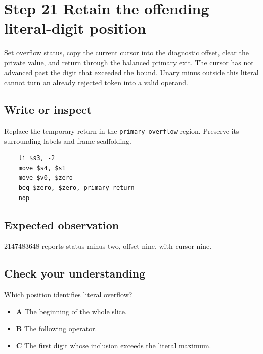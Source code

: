 \section{Step 21 Retain the offending literal-digit position}\label{expression-s21}

Set overflow status, copy the current cursor into the diagnostic offset, clear the private value, and return through the balanced primary exit. The cursor has not advanced past the digit that exceeded the bound. Unary minus outside this literal cannot turn an already rejected token into a valid operand.

\subsection{Write or inspect}
Replace the temporary return in the \texttt{primary\_overflow} region. Preserve its surrounding labels and frame scaffolding.

\begin{verbatim}
    li $s3, -2
    move $s4, $s1
    move $v0, $zero
    beq $zero, $zero, primary_return
    nop
\end{verbatim}
\subsection{Expected observation}
2147483648 reports status minus two, offset nine, with cursor nine.

\subsection{Check your understanding}
Which position identifies literal overflow?

\begin{itemize}
  \item \textbf{A} The beginning of the whole slice.
  \item \textbf{B} The following operator.
  \item \textbf{C} The first digit whose inclusion exceeds the literal maximum.
\end{itemize}
